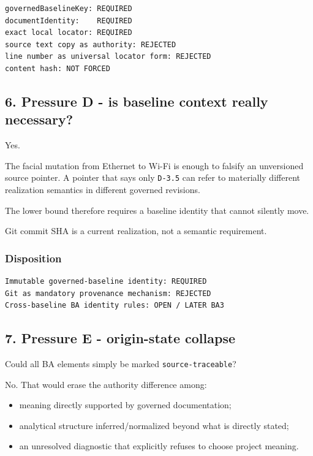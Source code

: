 \documentclass[11pt,a4paper]{article}
\providecommand{\tightlist}{\setlength{\itemsep}{0pt}\setlength{\parskip}{0pt}}
\begin{document}
\begin{verbatim}
governedBaselineKey: REQUIRED
documentIdentity:    REQUIRED
exact local locator: REQUIRED
source text copy as authority: REJECTED
line number as universal locator form: REJECTED
content hash: NOT FORCED
\end{verbatim}

\subsection{6. Pressure D - is baseline context really necessary?}\label{6-pressure-d---is-baseline-context-really-necessary}

Yes.

The facial mutation from Ethernet to Wi-Fi is enough to falsify an unversioned source pointer. A pointer that says only \texttt{D-3.5} can refer to materially different realization semantics in different governed revisions.

The lower bound therefore requires a baseline identity that cannot silently move.

Git commit SHA is a current realization, not a semantic requirement.

\subsubsection{Disposition}\label{disposition-3}

\begin{verbatim}
Immutable governed-baseline identity: REQUIRED
Git as mandatory provenance mechanism: REJECTED
Cross-baseline BA identity rules: OPEN / LATER BA3
\end{verbatim}

\subsection{7. Pressure E - origin-state collapse}\label{7-pressure-e---origin-state-collapse}

Could all BA elements simply be marked \texttt{source-traceable}?

No. That would erase the authority difference among:

\begin{itemize}
\tightlist
\item
  meaning directly supported by governed documentation;
\item
  analytical structure inferred/normalized beyond what is directly stated;
\item
  an unresolved diagnostic that explicitly refuses to choose project meaning.
\end{itemize}
\end{document}
